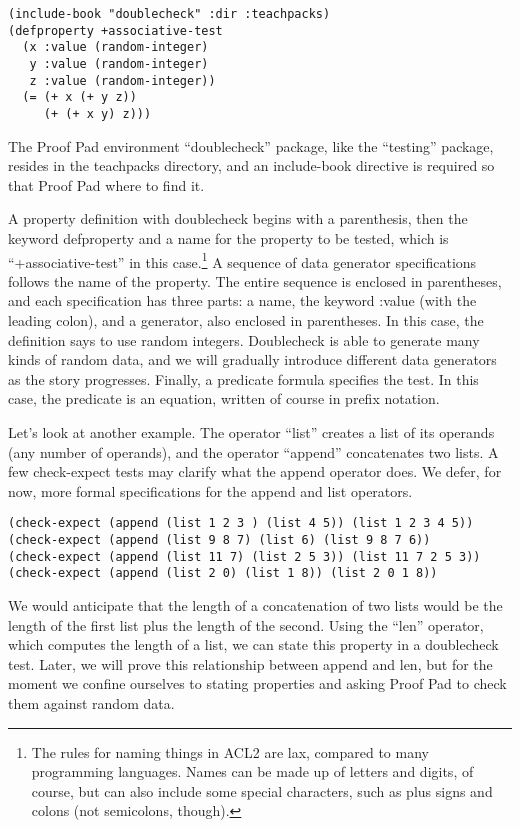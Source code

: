 \begin{Verbatim}
(include-book "doublecheck" :dir :teachpacks)
(defproperty +associative-test
  (x :value (random-integer)
   y :value (random-integer)
   z :value (random-integer))
  (= (+ x (+ y z))
     (+ (+ x y) z)))
\end{Verbatim}

The Proof Pad environment ``doublecheck'' package,
like the ``testing'' package,
resides in the teachpacks directory,
and an include-book directive is required so that Proof Pad where to find it.

A property definition with doublecheck begins with a parenthesis, then the keyword
defproperty and a name for the property to be tested,
which is ``+associative-test'' in this case.\footnote{The
rules for naming things in ACL2 are lax, compared to many
programming languages. Names can be made up of letters and digits, of course,
but can also include some special characters,
such as plus signs and colons (not semicolons, though).}
A sequence of data generator specifications follows the name of the property.
The entire sequence is enclosed in parentheses,
and each specification has three parts: a name, the keyword :value (with the leading colon),
and a generator, also enclosed in parentheses.
In this case, the definition says to use random integers.
Doublecheck is able to generate many kinds of random data,
and we will gradually introduce different data generators as the story progresses.
Finally, a predicate formula specifies the test.
In this case, the predicate is an equation,
written of course in prefix notation.

Let's look at another example.
\label{list-op-informal}
The operator ``list'' creates a list of its operands
(any number of operands), and
\label{append-op-informal}
the operator ``append'' concatenates two lists.
A few check-expect tests may clarify what the append operator does.
We defer, for now, more formal specifications for the append and list operators.

\begin{Verbatim}
(check-expect (append (list 1 2 3 ) (list 4 5)) (list 1 2 3 4 5))
(check-expect (append (list 9 8 7) (list 6) (list 9 8 7 6))
(check-expect (append (list 11 7) (list 2 5 3)) (list 11 7 2 5 3))
(check-expect (append (list 2 0) (list 1 8)) (list 2 0 1 8))
\end{Verbatim}

We would anticipate that the length of a concatenation of two lists
would be the length of the first list plus the length of the second.
\label{len-op-informal}
Using the ``len'' operator, which computes the length of a list,
we can state this property in a doublecheck test.
Later, we will prove this relationship between append and len,
but for the moment we confine ourselves to stating properties
and asking Proof Pad to check them against random data.

